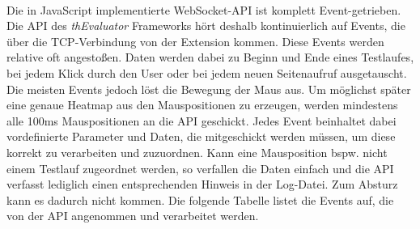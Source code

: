 \\
Die in JavaScript implementierte WebSocket-API ist komplett Event-getrieben. Die API des \textit{thEvaluator} Frameworks hört deshalb kontinuierlich auf Events, die über die TCP-Verbindung von der Extension kommen. Diese Events werden relative oft angestoßen. Daten werden dabei zu Beginn und Ende eines Testlaufes, bei jedem Klick durch den User oder bei jedem neuen Seitenaufruf ausgetauscht. Die meisten Events jedoch löst die Bewegung der Maus aus. Um möglichst später eine genaue Heatmap aus den Mauspositionen zu erzeugen, werden mindestens alle 100ms Mauspositionen an die API geschickt. Jedes Event beinhaltet dabei vordefinierte Parameter und Daten, die mitgeschickt werden müssen, um diese korrekt zu verarbeiten und zuzuordnen. Kann eine Mausposition bspw. nicht einem Testlauf zugeordnet werden, so verfallen die Daten einfach und die API verfasst lediglich einen entsprechenden Hinweis in der Log-Datei. Zum Absturz kann es dadurch nicht kommen. Die folgende Tabelle listet die Events auf, die von der API angenommen und verarbeitet werden.\\
\\
\\
